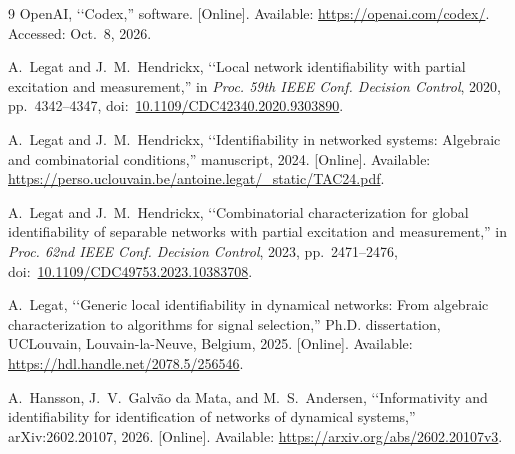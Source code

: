 \documentclass[letterpaper,10pt,conference]{ieeeconf}
\begin{document}
\begin{thebibliography}{9}
OpenAI, \lq\lq Codex,'' software.
[Online]. Available: \url{https://openai.com/codex/}.
Accessed: Oct.~8, 2026.

A.~Legat and J.~M.~Hendrickx, \lq\lq Local network identifiability with
partial excitation and measurement,'' in \emph{Proc. 59th IEEE Conf.
Decision Control}, 2020, pp.~4342--4347,
doi:~\href{https://doi.org/10.1109/CDC42340.2020.9303890}
{10.1109/CDC42340.2020.9303890}.

A.~Legat and J.~M.~Hendrickx, \lq\lq Identifiability in networked systems:
Algebraic and combinatorial conditions,'' manuscript, 2024.
[Online]. Available:
\url{https://perso.uclouvain.be/antoine.legat/_static/TAC24.pdf}.

A.~Legat and J.~M.~Hendrickx, \lq\lq Combinatorial characterization for
global identifiability of separable networks with partial excitation
and measurement,'' in \emph{Proc. 62nd IEEE Conf. Decision Control},
2023, pp.~2471--2476,
doi:~\href{https://doi.org/10.1109/CDC49753.2023.10383708}
{10.1109/CDC49753.2023.10383708}.

A.~Legat, \lq\lq Generic local identifiability in dynamical networks: From
algebraic characterization to algorithms for signal selection,''
Ph.D. dissertation, UCLouvain, Louvain-la-Neuve, Belgium, 2025.
[Online]. Available: \url{https://hdl.handle.net/2078.5/256546}.

A.~Hansson, J.~V.~Galv{\~a}o da Mata, and M.~S.~Andersen,
\lq\lq Informativity and identifiability for identification of
networks of dynamical systems,'' arXiv:2602.20107, 2026.
[Online]. Available: \url{https://arxiv.org/abs/2602.20107v3}.
\end{thebibliography}
\end{document}
